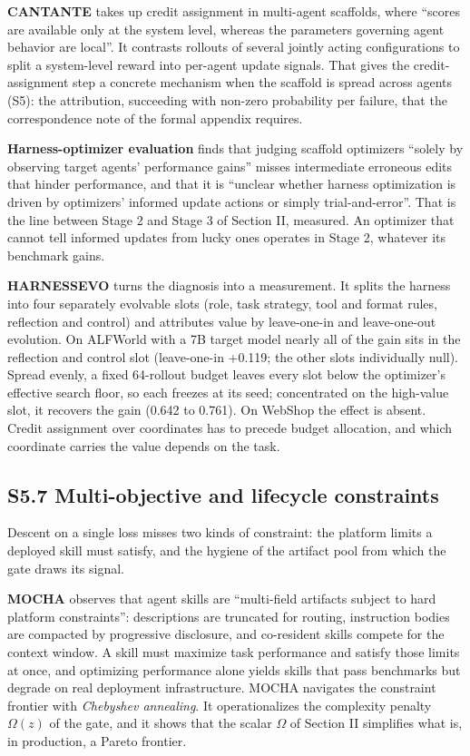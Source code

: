 \documentclass[
]{article}
\begin{document}
\textbf{CANTANTE} \cite{zehle2026cantante} takes up credit assignment
in multi-agent scaffolds, where ``scores are available only at the
system level, whereas the parameters governing agent behavior are
local''. It contrasts rollouts of several jointly acting configurations
to split a system-level reward into per-agent update signals. That gives
the credit-assignment step a concrete mechanism when the scaffold is
spread across agents (S5): the attribution, succeeding with non-zero
probability per failure, that the correspondence note of the formal
appendix requires.

\textbf{Harness-optimizer evaluation} \cite{ong2026harnesseval} finds
that judging scaffold optimizers ``solely by observing target agents'
performance gains'' misses intermediate erroneous edits that hinder
performance, and that it is ``unclear whether harness optimization is
driven by optimizers' informed update actions or simply
trial-and-error''. That is the line between Stage 2 and Stage 3 of
Section II, measured. An optimizer that cannot tell informed updates
from lucky ones operates in Stage 2, whatever its benchmark gains.

\textbf{HARNESSEVO} \cite{nguyen2026harnessevo} turns the diagnosis
into a measurement. It splits the harness into four separately evolvable
slots (role, task strategy, tool and format rules, reflection and
control) and attributes value by leave-one-in and leave-one-out
evolution. On ALFWorld with a 7B target model nearly all of the gain
sits in the reflection and control slot (leave-one-in +0.119; the other
slots individually null). Spread evenly, a fixed 64-rollout budget
leaves every slot below the optimizer's effective search floor, so each
freezes at its seed; concentrated on the high-value slot, it recovers
the gain (0.642 to 0.761). On WebShop the effect is absent. Credit
assignment over coordinates has to precede budget allocation, and which
coordinate carries the value depends on the task.

\subsection{S5.7 Multi-objective and lifecycle
constraints}\label{s5.7-multi-objective-and-lifecycle-constraints}

Descent on a single loss misses two kinds of constraint: the platform
limits a deployed skill must satisfy, and the hygiene of the artifact
pool from which the gate draws its signal.

\textbf{MOCHA} \cite{tanjim2026mocha} observes that agent skills are
``multi-field artifacts subject to hard platform constraints'':
descriptions are truncated for routing, instruction bodies are compacted
by progressive disclosure, and co-resident skills compete for the
context window. A skill must maximize task performance and satisfy those
limits at once, and optimizing performance alone yields skills that pass
benchmarks but degrade on real deployment infrastructure. MOCHA
navigates the constraint frontier with \emph{Chebyshev annealing}. It
operationalizes the complexity penalty \(\Omega(z)\) of the gate, and it
shows that the scalar \(\Omega\) of Section II simplifies what is, in
production, a Pareto frontier.
\end{document}
